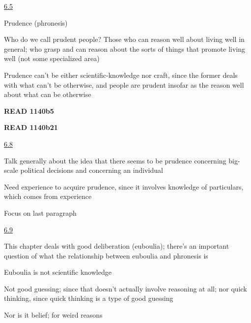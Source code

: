 \documentclass[11pt]{article}
\begin{document}
\noindent\underline{6.5}
\vspace*{4mm}

\noindent Prudence (phronesis)
\vspace*{2mm}

\noindent Who do we call prudent people? Those who can reason well about living well in general; who grasp and can reason about the sorts of things that promote living well (not some specialized area)
\vspace*{2mm}

\noindent Prudence can't be either scientific-knowledge nor craft, since the former deals with what can't be otherwise, and people are prudent insofar as the reason well about what can be otherwise
\vspace*{2mm}

\noindent\textbf{READ 1140b5}
\vspace*{2mm}

\noindent\textbf{READ 1140b21}
\vspace*{2mm}

\noindent\underline{6.8}
\vspace*{4mm}

\noindent Talk generally about the idea that there seems to be prudence concerning big-scale political decisions and concerning an individual
\vspace*{2mm}

\noindent Need experience to acquire prudence, since it involves knowledge of particulars, which comes from experience
\vspace*{2mm}

\noindent Focus on last paragraph
\vspace*{2mm}

\noindent\underline{6.9} 
\vspace*{4mm}

\noindent This chapter deals with good deliberation (euboulia); there's an important question of what the relationship between euboulia and phronesis is
\vspace*{2mm}

\noindent Euboulia is not scientific knowledge
\vspace*{2mm}

\noindent Not good guessing; since that doesn't actually involve reasoning at all; nor quick thinking, since quick thinking is a type of good guessing
\vspace*{2mm}

\noindent Nor is it belief; for weird reasons
\vspace*{2mm}
\end{document}
